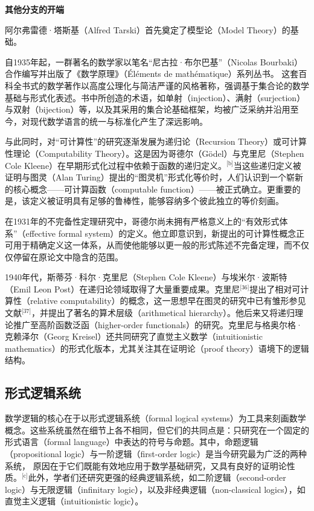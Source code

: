 \textbf{其他分支的开端}

阿尔弗雷德·塔斯基（Alfred Tarski）首先奠定了模型论（Model Theory）的基础。

自1935年起，一群著名的数学家以笔名“尼古拉·布尔巴基”（Nicolas Bourbaki）合作编写并出版了《数学原理》（Éléments de mathématique）系列丛书。  这套百科全书式的数学著作以高度公理化与简洁严谨的风格著称，强调基于集合论的数学基础与形式化表述。书中所创造的术语，如单射（injection）、满射（surjection）与双射（bijection）等，以及其采用的集合论基础框架，均被广泛采纳并沿用至今，对现代数学语言的统一与标准化产生了深远影响。

与此同时，对“可计算性”的研究逐渐发展为递归论（Recursion Theory）或可计算性理论（Computability Theory）。这是因为哥德尔（Gödel）与克里尼（Stephen Cole Kleene）在早期形式化过程中依赖于函数的递归定义。\(^\text{[b]}\)当这些递归定义被证明与图灵（Alan Turing）提出的“图灵机”形式化等价时，人们认识到一个崭新的核心概念——可计算函数（computable function）——被正式确立。更重要的是，该定义被证明具有足够的鲁棒性，能够容纳多个彼此独立的等价刻画。

在1931年的不完备性定理研究中，哥德尔尚未拥有严格意义上的“有效形式体系”（effective formal system）的定义。他立即意识到，新提出的可计算性概念正可用于精确定义这一体系，从而使他能够以更一般的形式陈述不完备定理，而不仅仅停留在原论文中隐含的范围。

1940年代，斯蒂芬·科尔·克里尼（Stephen Cole Kleene）与埃米尔·波斯特（Emil Leon Post）在递归论领域取得了大量重要成果。克里尼\(^\text{[36]}\)提出了相对可计算性（relative computability）的概念，这一思想早在图灵的研究中已有雏形参见文献\(^\text{[37]}\)，并提出了著名的算术层级（arithmetical hierarchy）。他后来又将递归理论推广至高阶函数泛函（higher-order functionals）的研究。克里尼与格奥尔格·克赖泽尔（Georg Kreisel）还共同研究了直觉主义数学（intuitionistic mathematics）的形式化版本，尤其关注其在证明论（proof theory）语境下的逻辑结构。
\subsection{形式逻辑系统}
数学逻辑的核心在于以形式逻辑系统（formal logical systems）为工具来刻画数学概念。这些系统虽然在细节上各不相同，但它们的共同点是：只研究在一个固定的形式语言（formal language）中表达的符号与命题。其中，命题逻辑（propositional logic）与一阶逻辑（first-order logic）是当今研究最为广泛的两种系统，  
原因在于它们既能有效地应用于数学基础研究，又具有良好的证明论性质。\(^\text{[c]}\)此外，学者们还研究更强的经典逻辑系统，如二阶逻辑（second-order logic）与无限逻辑（infinitary logic），以及非经典逻辑（non-classical logics），如直觉主义逻辑（intuitionistic logic）。
